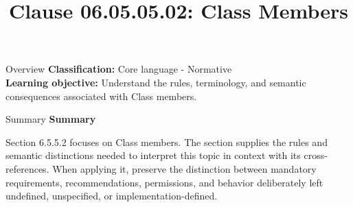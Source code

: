 \documentclass[10pt,letterpaper]{article}
\title{Clause 06.05.05.02: Class Members}
\author{}
\date{}
\begin{document}
\maketitle
\begin{CornellOverviewBox}{Overview}
\textbf{Classification:} Core language - Normative\\[2pt]
\textbf{Learning objective:} Understand the rules, terminology, and semantic consequences associated with Class members.
\end{CornellOverviewBox}\begin{CornellSummaryBox}{Summary}
{\sffamily\bfseries\color{Accent} Summary}\par\vspace{3pt}Section 6.5.5.2 focuses on Class members. The section supplies the rules and semantic distinctions needed to interpret this topic in context with its cross-references. When applying it, preserve the distinction between mandatory requirements, recommendations, permissions, and behavior deliberately left undefined, unspecified, or implementation-defined.
\end{CornellSummaryBox}
\end{document}
